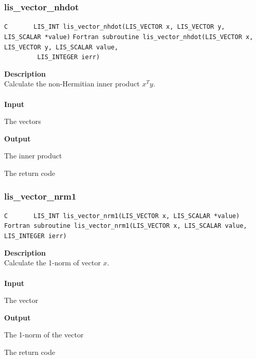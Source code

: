 \documentclass[a4paper]{article}
\newcommand{\namelistlabel}[1]{\mbox{#1}\hfill}
\newenvironment{namelist}[1]{%
\begin{list}{}
  {\let\makelabel\namelistlabel
  \settowidth{\labelwidth}{#1}
  \setlength{\leftmargin}{1.1\labelwidth}}
  }{%
\end{list}}
\begin{document}
\subsubsection{lis\_vector\_nhdot}
\begin{screen}
\verb|C       LIS_INT lis_vector_nhdot(LIS_VECTOR x, LIS_VECTOR y, LIS_SCALAR *value)|
\verb|Fortran subroutine lis_vector_nhdot(LIS_VECTOR x, LIS_VECTOR y, LIS_SCALAR value,|\\
\verb|         LIS_INTEGER ierr)|
\end{screen}
{\bf Description}\\
\indent
Calculate the non-Hermitian inner product $x^{T}y$.
\\ \\
\noindent
{\bf Input}
\begin{namelist}{XXXXXXXXXXXXXXXXXXXX}
\item[\tt x, y] The vectors
\end{namelist}
{\bf Output}
\begin{namelist}{XXXXXXXXXXXXXXXXXXXX}
\item[\tt value] The inner product
\item[\tt ierr] The return code
\end{namelist}

\newpage
\subsubsection{lis\_vector\_nrm1}
\begin{screen}
\verb|C       LIS_INT lis_vector_nrm1(LIS_VECTOR x, LIS_SCALAR *value)|\\
\verb|Fortran subroutine lis_vector_nrm1(LIS_VECTOR x, LIS_SCALAR value, LIS_INTEGER ierr)|
\end{screen}
{\bf Description}\\
\indent
Calculate the 1-norm of vector $x$.
\\ \\
\noindent
{\bf Input}
\begin{namelist}{XXXXXXXXXXXXXXXXXXXX}
\item[\tt x] The vector
\end{namelist}
{\bf Output}
\begin{namelist}{XXXXXXXXXXXXXXXXXXXX}
\item[\tt value] The 1-norm of the vector
\item[\tt ierr] The return code
\end{namelist}
\end{document}
